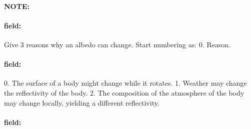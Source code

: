 \documentclass[12pt]{article}
\newenvironment{note}{\paragraph{NOTE:}}{}
\newenvironment{field}{\paragraph{field:}}{}
\begin{document}
\begin{note}
   \begin{field}
       Give 3 reasons why an albedo can change. Start numbering as: 0. Reason.
   \end{field}
   \begin{field}
		0. The surface of a body might change while it rotates.
		1. Weather may change the reflectivity of the body.
		2. The composition of the atmosphere of the body may change locally,  yielding a different reflectivity.
   \end{field}
   \begin{field}
   \end{field}
\end{note}
\end{document}

